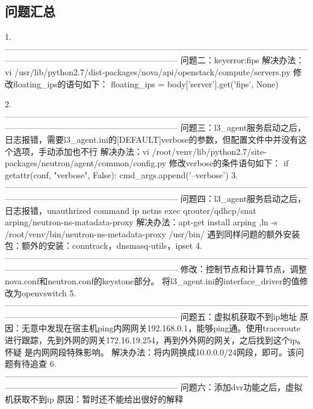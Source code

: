 \documentclass[a4paper,left=1.5cm,right=1.5cm,11pt]{article}
\begin{document}
\tableofcontents

\clearpage

\subsection{问题汇总}
1.--------------------------------------------------------------------------------------------------------------------------------------------------------------------------
	问题二：keyerror:fips
	解决办法：vi /usr/lib/python2.7/dist-packages/nova/api/openstack/compute/servers.py
	修改floating_ips的语句如下：
	floating_ips = body['server'].get('fips', None)

2.--------------------------------------------------------------------------------------------------------------------------------------------------------------------------
	问题三：l3_agent服务启动之后，日志报错，需要l3_agent.ini的[DEFAULT]verbose的参数，但配置文件中并没有这个选项，手动添加也不行
	解决办法：vi /root/venv/lib/python2.7/site-packages/neutron/agent/common/config.py  
	修改verbose的条件语句如下：
	if getattr(conf, "verbose", False):
        cmd_args.append('--verbose')
3.--------------------------------------------------------------------------------------------------------------------------------------------------------------------------
	问题四：l3_agent服务启动之后，日志报错，unauthrized command ip netns exec qrouter/qdhcp/snat arping/neutron-ns-matadata-proxy
	解决办法：apt-get install arping ,ln -s /root/venv/bin/neutron-ns-metadata-proxy /usr/bin/
	遇到同样问题的额外安装包：额外的安装：conntrack，dnsmasq-utils，ipset
4.--------------------------------------------------------------------------------------------------------------------------------------------------------------------------
	修改：控制节点和计算节点，调整nova.conf和neutron.conf的keystone部分。
	将l3_agent.ini的interface_driver的值修改为openvswitch
5.--------------------------------------------------------------------------------------------------------------------------------------------------------------------------
	问题五：虚拟机获取不到ip地址
	原因：无意中发现在宿主机ping内网网关192.168.0.1，能够ping通。使用traceroute进行跟踪，先到外网的网关172.16.19.254，再到外外网的网关，之后找到这个ip。怀疑
	是内网网段特殊影响。
	解决办法：将内网换成10.0.0.0/24网段，即可。该问题有待追查
6.--------------------------------------------------------------------------------------------------------------------------------------------------------------------------
	问题六：添加dvr功能之后，虚拟机获取不到ip
	原因：暂时还不能给出很好的解释
\end{document}
